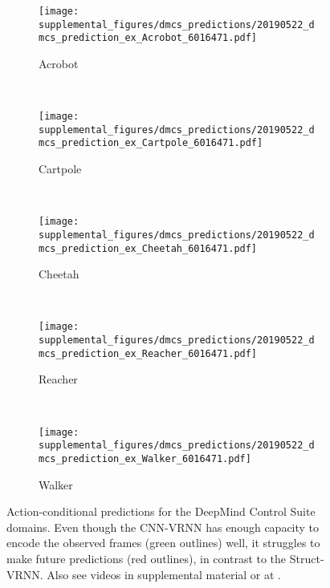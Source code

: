  
\begin{figure*}[t]
    \centering
    \begin{subfigure}[t]{0.9\textwidth}
        \texttt{[image: supplemental\_figures/dmcs\_predictions/20190522\_dmcs\_prediction\_ex\_Acrobot\_6016471.pdf]}
        \caption{Acrobot}
    \end{subfigure}\\
    \vspace{0.1in}
    \begin{subfigure}[t]{0.9\textwidth}
        \texttt{[image: supplemental\_figures/dmcs\_predictions/20190522\_dmcs\_prediction\_ex\_Cartpole\_6016471.pdf]}
        \caption{Cartpole}
    \end{subfigure}\\
    \vspace{0.1in}
    \begin{subfigure}[t]{0.9\textwidth}
        \texttt{[image: supplemental\_figures/dmcs\_predictions/20190522\_dmcs\_prediction\_ex\_Cheetah\_6016471.pdf]}
        \caption{Cheetah}
    \end{subfigure}\\
    \vspace{0.1in}
    \begin{subfigure}[t]{0.9\textwidth}
        \texttt{[image: supplemental\_figures/dmcs\_predictions/20190522\_dmcs\_prediction\_ex\_Reacher\_6016471.pdf]}
        \caption{Reacher}
    \end{subfigure}\\
    \vspace{0.1in}
    \begin{subfigure}[t]{0.9\textwidth}
        \texttt{[image: supplemental\_figures/dmcs\_predictions/20190522\_dmcs\_prediction\_ex\_Walker\_6016471.pdf]}
        \caption{Walker}
    \end{subfigure}
    \caption{Action-conditional predictions for the DeepMind Control Suite domains. Even though the CNN-VRNN has enough capacity to encode the observed frames (green outlines) well, it struggles to make future predictions (red outlines), in contrast to the Struct-VRNN. Also see videos in supplemental material or at \supplementalUrl.}
    \label{fig:dmcs_predictions}
\end{figure*} 
